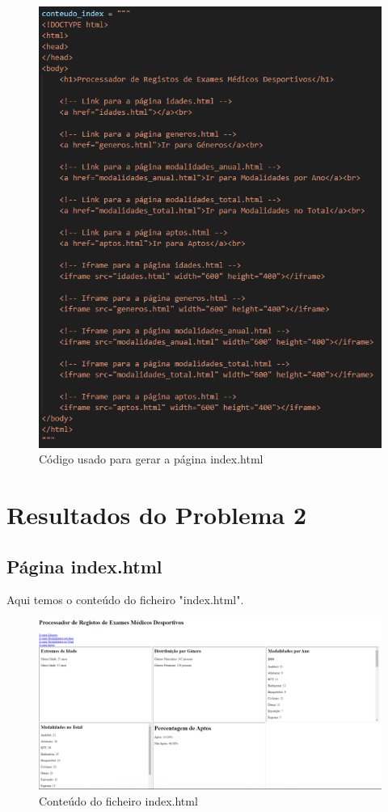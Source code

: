 \documentclass[11pt,a4paper]{report}%
\begin{document}
\begin{figure}[htbp]
\centerline{\includegraphics{gerar_index_html.png}}
\caption{Código usado para gerar a página index.html}
\label{fig}
\end{figure}


\newpage
\section{Resultados do Problema 2} \label{sec:resProb2} %
\subsection{Página index.html} \label{subsec:indc}
Aqui temos o conteúdo do ficheiro "index.html".

\begin{figure}[htbp]
\centerline{\includegraphics[scale=0.7]{index_html.png}}
\caption{Conteúdo do ficheiro index.html}
\label{fig}
\end{figure}
\end{document}
